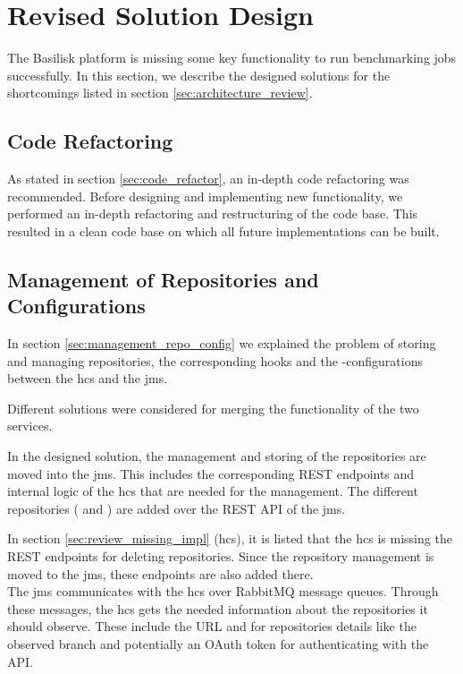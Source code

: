 \section{Revised Solution Design}
\label{sec:revised_solution_design}

The Basilisk platform is missing some key functionality to run benchmarking jobs successfully.
In this section, we describe the designed solutions for the shortcomings listed in section \ref{sec:architecture_review}.


\subsection{Code Refactoring}
\label{sec:impl_code_refactor}
As stated in section \ref{sec:code_refactor}, an in-depth code refactoring was recommended.
Before designing and implementing new functionality, we performed an in-depth refactoring and restructuring of the code base.
This resulted in a clean code base on which all future implementations can be built.


\subsection{Management of Repositories and Configurations}
\label{sec:management_repo_config_design}
In section \ref{sec:management_repo_config} we explained the problem of storing and managing repositories, the corresponding hooks and the \ts{}-configurations between the \acf{hcs} and the \acf{jms}.

Different solutions were considered for merging the functionality of the two services.

In the designed solution, the management and storing of the repositories are moved into the \ac{jms}.
This includes the corresponding REST endpoints and internal logic of the \ac{hcs} that are needed for the management.
The different repositories (\gh{} and \dockh{}) are added over the REST API of the \ac{jms}.

In section \ref{sec:review_missing_impl} (\acl{hcs}), it is listed that the \ac{hcs} is missing the REST endpoints for deleting repositories.
Since the repository management is moved to the \ac{jms}, these endpoints are also added there.
\\

The \ac{jms} communicates with the \ac{hcs} over RabbitMQ message queues.
Through these messages, the \ac{hcs} gets the needed information about the repositories it should observe.
These include the URL and for \gh{} repositories details like the observed branch and potentially an OAuth token for authenticating with the API.

